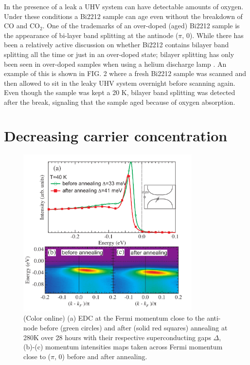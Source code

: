 \documentclass[aps,twocolumn,amsmath,amssymb,showpacs,prb,
superscriptaddress,unsortedaddress]{revtex4}
\begin{document}
In the presence of a leak a UHV system can have detectable amounts of
oxygen.  Under these conditions a Bi2212 sample can age even without
the breakdown of CO and CO$_2$.  One of the trademarks of an
over-doped (aged) Bi2212 sample is the appearance of bi-layer band
splitting at the antinode ($\pi$, 0).  While there has been a
relatively active discussion on whether Bi2212 contains bilayer band
splitting all the time or just in an over-doped state; bilayer
splitting has only been seen in over-doped samples when using a helium
discharge lamp \cite{Y.-D. Chaung 2004, S. V. Borisenko 2004, S. V.
Borisenko 2006, A. A. Kordyuk 2004}. An example of this is shown in
FIG. 2 where a fresh Bi2212 sample was scanned and then allowed to sit
in the leaky UHV system overnight before scanning again. Even though
the sample was kept a 20 K, bilayer band splitting was detected after
the break, signaling that the sample aged because of oxygen
absorption.

\section{Decreasing carrier concentration}
\begin{figure}
\includegraphics[width=3.6in]{fig4.pdf}
\caption{(Color online) (a) EDC at the Fermi momentum close to the
anti-node before (green circles) and after (solid red squares)
annealing at 280K over 28 hours with their respective superconducting
gaps $\Delta$, (b)-(c) momentum intensities maps taken across Fermi
momentum close to ($\pi$, 0) before and after annealing.}
\label{Fig. 3}
\end{figure}
\end{document}
